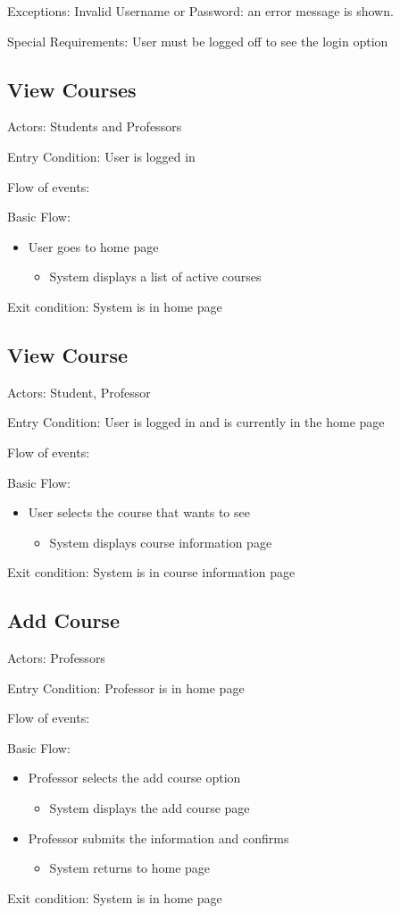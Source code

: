 Exceptions: Invalid Username or Password: an error message is 
shown.

Special Requirements: User must be logged off to see the login 
option

\subsection*{View Courses}
Actors: Students and Professors

Entry Condition: User is logged in

Flow of events:

Basic Flow:

\begin{itemize}
\item User goes to home page
\begin{itemize}
\item System displays a list of active courses
\end{itemize}
\end{itemize}
Exit condition: System is in home page

\subsection*{View Course}
Actors: Student, Professor

Entry Condition: User is logged in and is currently in the home 
page

Flow of events:

Basic Flow:

\begin{itemize}
\item User selects the course that wants to see
\begin{itemize}
\item System displays course information page
\end{itemize}
\end{itemize}
Exit condition: System is in course information page

\subsection*{Add Course}
Actors: Professors

Entry Condition: Professor is in home page

Flow of events:

Basic Flow:

\begin{itemize}
\item Professor selects the add course option
\begin{itemize}
\item System displays the add course page
\end{itemize}
\item Professor submits the information and confirms
\begin{itemize}
\item System returns to home page
\end{itemize}
\end{itemize}
Exit condition: System is in home page


